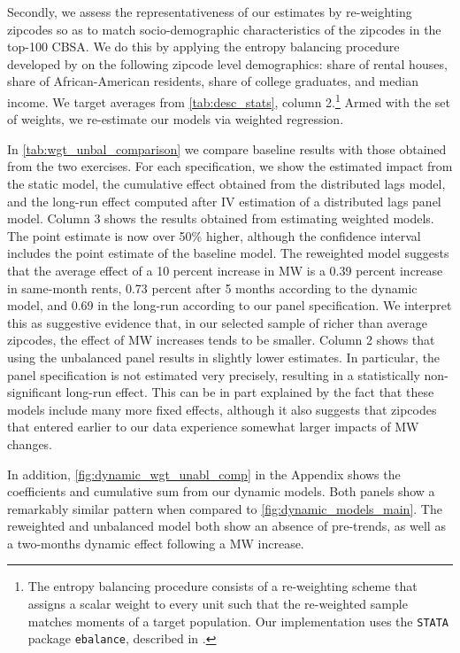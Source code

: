 Secondly, we assess the representativeness of our estimates by re-weighting zipcodes so as to match 
socio-demographic characteristics of the zipcodes in the top-100 CBSA. We do this by applying the 
entropy balancing procedure developed by \cite{hainmueller2012entropy} on the following zipcode 
level demographics: share of rental houses, share of African-American residents, share of college 
graduates, and median income. We target averages from \autoref{tab:desc_stats}, column 
2.\footnote{The entropy balancing procedure consists of a re-weighting scheme that assigns a scalar 
	weight to every unit such that the re-weighted sample matches moments of a target population. Our
	implementation uses the \texttt{STATA} package \texttt{ebalance}, described in 
	\textcite{hainmueller2013ebalance}.} 
Armed with the set of weights, we re-estimate our models via weighted regression.

In \autoref{tab:wgt_unbal_comparison} we compare baseline results with those obtained from the 
two exercises. For each specification, we show the estimated impact from the static model, the 
cumulative effect obtained from the distributed lags model, and the long-run effect computed after
IV estimation of a distributed lags panel model. Column 3 shows the results obtained from estimating 
weighted models. The point estimate is now over 50\% higher, although the confidence interval includes
the point estimate of the baseline model. The reweighted model suggests that the average effect of a 
10 percent increase in MW is a 0.39 percent increase in same-month rents, 0.73 percent after 5 months
according to the dynamic model, and 0.69 in the long-run according to our panel specification. We 
interpret this as suggestive evidence that, in our selected sample of richer than average zipcodes,
the effect of MW increases tends to be smaller. Column 2 shows that using the unbalanced panel results 
in slightly lower estimates. In particular, the panel specification is not estimated very precisely,
resulting in a statistically non-significant long-run effect. This can be in part explained by the 
fact that these models include many more fixed effects, although it also suggests that zipcodes that 
entered earlier to our data experience somewhat larger impacts of MW changes.

In addition, \autoref{fig:dynamic_wgt_unabl_comp} in the Appendix shows the coefficients and cumulative 
sum from our dynamic models. Both panels show a remarkably similar pattern when compared to 
\autoref{fig:dynamic_models_main}. The reweighted and unbalanced model both show an absence of 
pre-trends, as well as a two-months dynamic effect following a MW increase.


